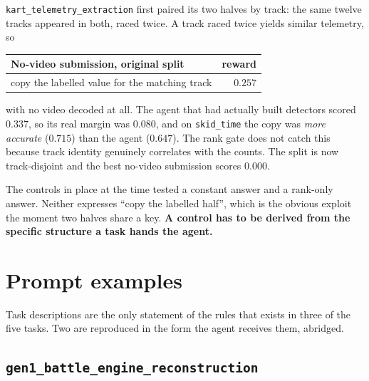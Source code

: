 \documentclass[11pt,a4paper]{article}
\newcommand{\task}[1]{\texttt{#1}}
\begin{document}
\task{kart\_telemetry\_extraction} first paired its two halves by track: the same
twelve tracks appeared in both, raced twice. A track raced twice yields similar
telemetry, so

\begin{center}
\small
\begin{tabular}{@{}lr@{}}
\toprule
No-video submission, original split & reward \\
\midrule
copy the labelled value for the matching track & $\mathbf{0.257}$ \\
\bottomrule
\end{tabular}
\end{center}

with no video decoded at all. The agent that had actually built detectors scored
$0.337$, so its real margin was $0.080$, and on \texttt{skid\_time} the copy was
\emph{more accurate} ($0.715$) than the agent ($0.647$). The rank gate does not catch
this because track identity genuinely correlates with the counts. The split is now
track-disjoint and the best no-video submission scores $0.000$.

The controls in place at the time tested a constant answer and a rank-only answer.
Neither expresses ``copy the labelled half'', which is the obvious exploit the moment
two halves share a key. \textbf{A control has to be derived from the specific
structure a task hands the agent.}

\section{Prompt examples}

Task descriptions are the only statement of the rules that exists in three of the
five tasks. Two are reproduced in the form the agent receives them, abridged.

\subsection{\task{gen1\_battle\_engine\_reconstruction}}
\end{document}
